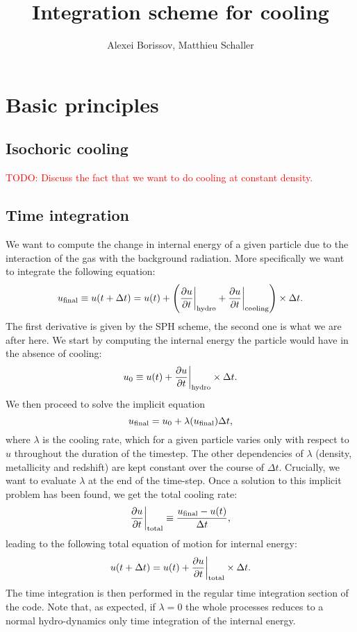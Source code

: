 \documentclass[fleqn, usenatbib, useAMS, a4paper]{mnras}
\title{Integration scheme for cooling}
\author{Alexei Borissov, Matthieu Schaller}
\newcommand{\todo}[1]{{\textcolor{red}{TODO: #1}\\}}
\begin{document}
\maketitle

\section{Basic principles}

\subsection{Isochoric cooling}

\todo{Discuss the fact that we want to do cooling at constant
  density.}

\subsection{Time integration}

We want to compute the change in internal energy of a given particle
due to the interaction of the gas with the background radiation. More
specifically we want to integrate the following equation:
\begin{equation}
  u_{\rm final} \equiv u(t+\Delta t) = u(t) + \left(\frac{\partial u}{\partial t}\bigg|_{\rm
    hydro} + \frac{\partial u}{\partial t}\bigg|_{\rm cooling}\right)
  \times \Delta t.
\end{equation}
The first derivative is given by the SPH scheme, the second one is
what we are after here. We start by computing the internal energy the
particle would have in the absence of cooling:
\begin{equation}
  u_0 \equiv u(t) + \frac{\partial u}{\partial t}\bigg|_{\rm
    hydro} \times \Delta t.
\end{equation}
We then proceed to solve the implicit equation
\begin{equation}
 u_{\rm final} = u_0 + \lambda(u_{\rm final}) \Delta t,
\end{equation}
where $\lambda$ is the cooling rate, which for a given particle varies
only with respect to $u$ throughout the duration of the timestep. The
other dependencies of $\lambda$ (density, metallicity and redshift)
are kept constant over the course of $\Delta t$. Crucially, we want to
evaluate $\lambda$ at the end of the time-step. Once a solution to this
implicit problem has been found, we get the total cooling rate:
\begin{equation}
  \frac{\partial u}{\partial t}\bigg|_{\rm total} \equiv \frac{u_{\rm final} -
    u(t)}{\Delta t},
\end{equation}
leading to the following total equation of motion for internal energy:
\begin{equation}
  u(t+\Delta t) = u(t) + \frac{\partial u}{\partial t}\bigg|_{\rm
    total} \times \Delta t.
\end{equation}
The time integration is then performed in the regular time integration
section of the code. Note that, as expected, if $\lambda=0$ the whole
processes reduces to a normal hydro-dynamics only time integration of
the internal energy.
\end{document}
